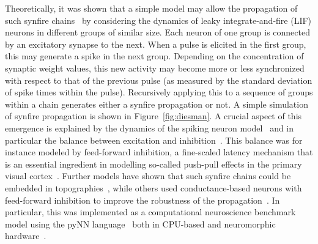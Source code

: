 \documentclass[brainsci, %
               review,submit,pdftex,moreauthors
               ]{Definitions/mdpi}
\begin{document}
Theoretically, it was shown that a simple model may allow the propagation of such synfire chains~\citep{gewaltig_propagation_2001} by considering the dynamics of leaky integrate-and-fire (LIF) neurons in different groups of similar size. Each neuron of one group is connected by an excitatory synapse to the next. When a pulse is elicited in the first group, this may generate a spike in the next group. Depending on the concentration of synaptic weight values, this new activity may become more or less synchronized with respect to that of the previous pulse (as measured by the standard deviation of spike times within the pulse). Recursively applying this to a sequence of groups within a chain generates either a synfire propagation or not. A simple simulation of synfire propagation is shown in Figure~\ref{fig:diesman}. A crucial aspect of this emergence is explained by the dynamics of the spiking neuron model~\citep{gerstner_time_1995} and in particular the balance between excitation and inhibition~\citep{azouz_stimulus-selective_2008}. This balance was for instance modeled by feed-forward inhibition, a fine-scaled latency mechanism that is an essential ingredient in modelling so-called push-pull effects in the primary visual cortex~\citep{kremkow_push-pull_2016}. Further models have shown that such synfire chains could be embedded in topographies~\citep{aviel_embedding_2003}, while others used conductance-based neurons with feed-forward inhibition to improve the robustness of the propagation~\citep{kremkow_functional_2010}. In particular, this was implemented as a computational neuroscience benchmark model using the pyNN language~\citep{davison_pynn_2008} both in CPU-based and neuromorphic hardware~\citep{pfeil_six_2013}. %
%
\end{document}
